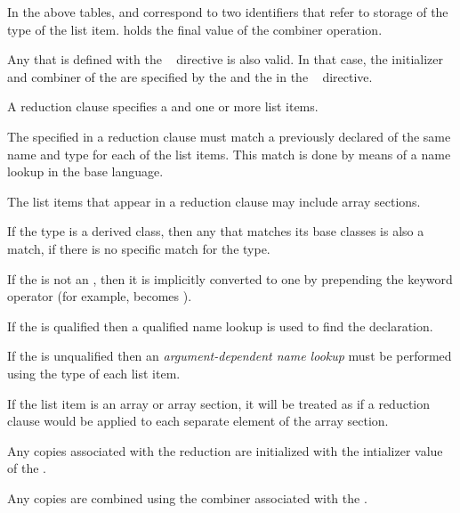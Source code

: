 \vspace{\baselineskip}

In the above tables,  and  correspond to two
identifiers that refer to storage of the type of the list item. 
holds the final value of the combiner operation.

Any  that is defined with the ~
directive is also valid. In that case, the initializer and combiner of the
 are specified by the  and
the  in the ~ directive.




\descr
A reduction clause specifies a  and one or more list
items.

The  specified in a reduction clause must match a
previously declared  of the same name and type for
each of the list items. This match is done by means of a name lookup in the
base language.

The list items that appear in a reduction clause may include array sections.


\begin{cppspecific}
If the type is a derived class, then any  that
matches its base classes is also a match, if there is no specific match for the
type.

If the  is not an , then it is
implicitly converted to one by prepending the keyword operator (for example,
\code{+} becomes {\code{+}}).

If the  is qualified then a qualified name lookup is
used to find the declaration.

If the  is unqualified then an \emph{argument-dependent name lookup}
must be performed using the type of each list item.
\end{cppspecific}

If the list item is an array or array section, it will be treated as
if a reduction clause would be applied to each separate element
of the array section.

Any copies associated with the reduction are initialized with the intializer
value of the .

Any copies are combined using the combiner associated with the
.


